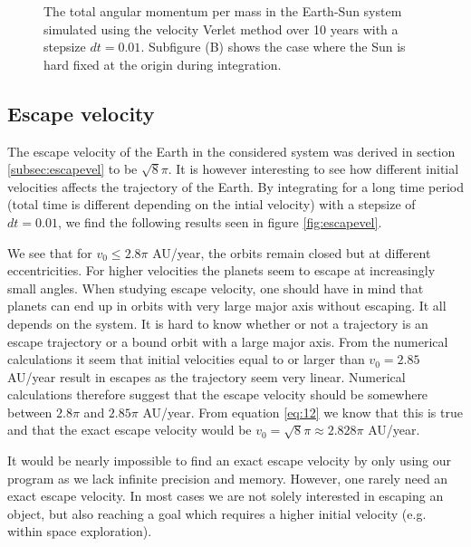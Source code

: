 \documentclass[a4paper, 10pt, reqno]{amsart}
\begin{document}
\begin{figure}
    \centering
    \caption{The total angular momentum per mass in the Earth-Sun system simulated using the velocity Verlet method over 10 years with a stepsize $dt = 0.01$. Subfigure (B) shows the case where the Sun is hard fixed at the origin during integration.}
    \label{fig:momentum}
\end{figure}






\subsection{Escape velocity} The escape velocity of the Earth in the considered system was derived in section \ref{subsec:escapevel} to be $\sqrt{8} \pi$. It is however interesting to see how different initial velocities affects the trajectory of the Earth. By integrating for a long time period (total time is different depending on the intial velocity) with a stepsize of $dt = 0.01$, we find the following results seen in figure \ref{fig:escapevel}. 

We see that for $v_0 \leq 2.8 \pi$ AU/year, the orbits remain closed but at different eccentricities. For higher velocities the planets seem to escape at increasingly small angles. When studying escape velocity, one should have in mind that planets can end up in orbits with very large major axis without escaping. It all depends on the system. It is hard to know whether or not a trajectory is an escape trajectory or a bound orbit with a large major axis. From the numerical calculations it seem that initial velocities equal to or larger than $v_0 = 2.85$ AU/year result in escapes as the trajectory seem very linear. Numerical calculations therefore suggest  that the escape velocity should be somewhere between $2.8 \pi$ and $2.85 \pi$ AU/year. From equation \ref{eq:12} we know that this is true and that the exact escape velocity would be $v_0 = \sqrt{8}\pi \approx 2.828 \pi$ AU/year.

It would be nearly impossible to find an exact escape velocity by only using our program as we lack infinite precision and memory. However, one rarely need an exact escape velocity. In most cases we are not solely interested in escaping an object, but also reaching a goal which requires a higher initial velocity (e.g. within space exploration). 
\end{document}
